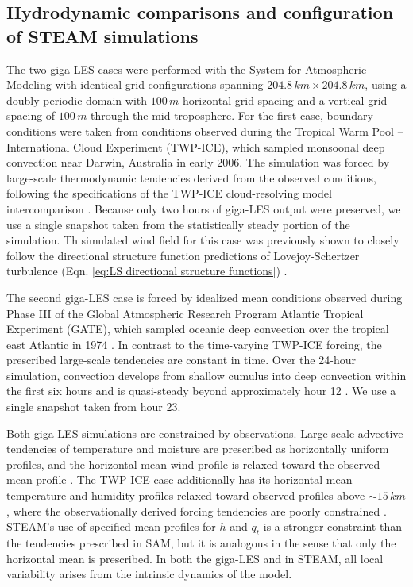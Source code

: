 \documentclass[acp, manuscript, english]{copernicus}
\begin{document}
\subsection{Hydrodynamic comparisons and configuration of STEAM simulations} \label{sect:hydrodynamic comparisons}

The two giga-LES cases were performed with the System for Atmospheric Modeling \citep[SAM;][]{khairoutdinov2003} with identical grid configurations spanning $204.8\,\unit{km}\times204.8\,\unit{km}$, using a doubly periodic domain with $100\,\unit{m}$ horizontal grid spacing and a vertical grid spacing of $100\,\unit{m}$ through the mid-troposphere.
For the first case, boundary conditions were taken from conditions observed during the Tropical Warm Pool -- International Cloud Experiment (TWP-ICE), which sampled monsoonal deep convection near Darwin, Australia in early 2006. The simulation was forced by large-scale thermodynamic tendencies derived from the observed conditions, following the specifications of the TWP-ICE cloud-resolving model intercomparison \citep{dazlichGigaLarge2013, fridlind2010}.
Because only two hours of giga-LES output were preserved, we use a single snapshot taken from the statistically steady portion of the simulation. Th simulated wind field for this case was previously shown to closely follow the directional structure function predictions of Lovejoy-Schertzer turbulence (Eqn. \ref{eq:LS directional structure functions}) \citep{dewitt2025bpreprint}.

The second giga-LES case is forced by idealized mean conditions observed during Phase III of the Global Atmospheric Research Program Atlantic Tropical Experiment (GATE), which sampled oceanic deep convection over the tropical east Atlantic in 1974 \citep{khairoutdinov2009}. In contrast to the time-varying TWP-ICE forcing, the prescribed large-scale tendencies are constant in time. Over the 24-hour simulation, convection develops from shallow cumulus into deep convection within the first six hours and is quasi-steady beyond approximately hour 12 \citep{khairoutdinov2009}. We use a single snapshot taken from hour 23.

Both giga-LES simulations are constrained by observations. Large-scale advective tendencies of temperature and moisture are prescribed as horizontally uniform profiles, and the horizontal mean wind profile is relaxed toward the observed mean profile \citep{khairoutdinov2009, fridlind2010}. The TWP-ICE case additionally has its horizontal mean temperature and humidity profiles relaxed toward observed profiles above ${\sim}15\,\unit{km}$, where the observationally derived forcing tendencies are poorly constrained \citep{fridlind2010}. STEAM's use of specified mean profiles for $h$ and $q_t$ is a stronger constraint than the tendencies prescribed in SAM, but it is analogous in the sense that only the horizontal mean is prescribed. In both the giga-LES and in STEAM, all local variability arises from the intrinsic dynamics of the model.
\end{document}

